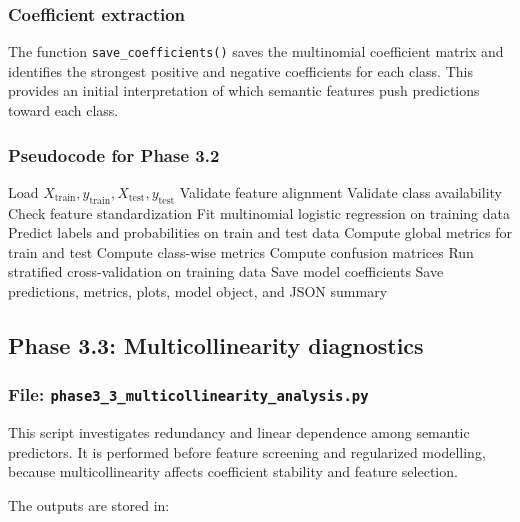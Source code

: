 \documentclass{ipgpmaster}
\begin{document}
\subsubsection{Coefficient extraction}

The function \texttt{save\_coefficients()} saves the multinomial coefficient matrix and identifies the strongest positive and negative coefficients for each class. This provides an initial interpretation of which semantic features push predictions toward each class.

\subsubsection{Pseudocode for Phase 3.2}

\begin{algorithm}[H]
\caption{Phase 3.2: Baseline multinomial logistic regression}
\begin{algorithmic}[1]
\State Load \(X_{\text{train}}, y_{\text{train}}, X_{\text{test}}, y_{\text{test}}\)
\State Validate feature alignment
\State Validate class availability
\State Check feature standardization
\State Fit multinomial logistic regression on training data
\State Predict labels and probabilities on train and test data
\State Compute global metrics for train and test
\State Compute class-wise metrics
\State Compute confusion matrices
\State Run stratified cross-validation on training data
\State Save model coefficients
\State Save predictions, metrics, plots, model object, and JSON summary
\end{algorithmic}
\end{algorithm}

\subsection{Phase 3.3: Multicollinearity diagnostics}

\subsubsection{File: \texttt{phase3\_3\_multicollinearity\_analysis.py}}

This script investigates redundancy and linear dependence among semantic predictors. It is performed before feature screening and regularized modelling, because multicollinearity affects coefficient stability and feature selection.

The outputs are stored in:
\end{document}
